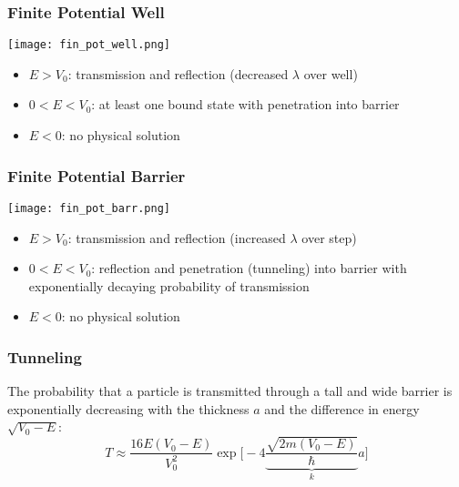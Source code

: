 \subsubsection{Finite Potential Well}
\begin{center}
    \texttt{[image: fin\_pot\_well.png]}
\end{center}
\begin{itemize}
    \item $E>V_0$: transmission and reflection (decreased $\lambda$ over well)
    \item $0<E<V_0$: at least one bound state with penetration into barrier
    \item $E<0$: no physical solution
\end{itemize}

\subsubsection{Finite Potential Barrier}
\begin{center}
    \texttt{[image: fin\_pot\_barr.png]}
\end{center}
\begin{itemize}
    \item $E>V_0$: transmission and reflection (increased $\lambda$ over step)
    \item $0<E<V_0$: reflection and penetration (tunneling) into barrier with exponentially decaying probability of transmission
    \item $E<0$: no physical solution
\end{itemize}

\subsubsection{Tunneling}
The probability that a particle is transmitted through a tall and wide barrier is exponentially decreasing with the thickness $a$ and the difference in energy $\sqrt{V_0-E}$:
\noindent\begin{equation*}
    T\approx\frac{16E(V_0-E)}{V_0^2}\exp\Biggl[-4 \underbrace{\frac{\sqrt{2m(V_0-E)}}{\hbar}}_{k} a\Biggr]
\end{equation*}